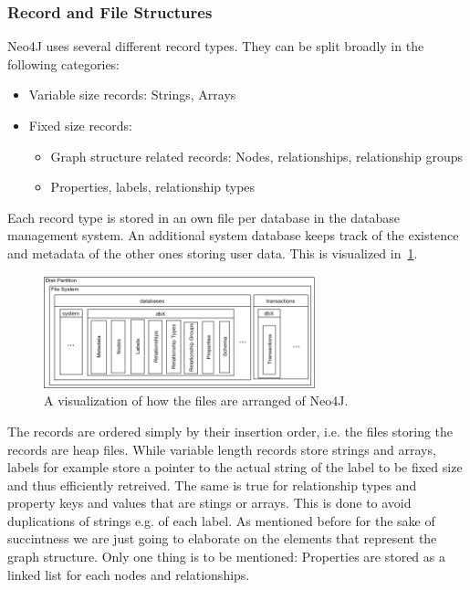         \subsubsection*{Record and File Structures}\label{n4j-struct}
        Neo4J uses several different record types. They can be split broadly in the following categories:
        \begin{itemize}
         \item Variable size records: Strings, Arrays
         \item Fixed size records:
         \begin{itemize}
          \item Graph structure related records: Nodes, relationships, relationship groups
          \item Properties, labels, relationship types
         \end{itemize}
        \end{itemize}
        
        Each record type is stored in an own file per database in the database management system.
        An additional system database keeps track of the existence and metadata of the other ones storing user data.
        This is visualized in~\ref{n4j-disk}.
        \begin{figure}[htp]
            \begin{center}
                \includegraphics[keepaspectratio,height=0.4\textheight,width=0.7\textwidth]{img/04-databases/N4J_disk_view.png}
            \end{center}
            \caption{A visualization of how the files are arranged of Neo4J.}
            \label{n4j-disk}
        \end{figure}
        
        The records are ordered simply by their insertion order, i.e. the files storing the records are heap files.
        While variable length records store strings and arrays, labels for example store a pointer to the actual string of the label to be fixed size and thus efficiently retreived.
        The same is true for relationship types and property keys and values that are stings or arrays.
        This is done to avoid duplications of strings e.g. of each label.
        As mentioned before for the sake of succintness we are just going to elaborate on the elements that represent the graph structure. 
        Only one thing is to be mentioned: 
        Properties are stored as a linked list for each nodes and relationships.
        

